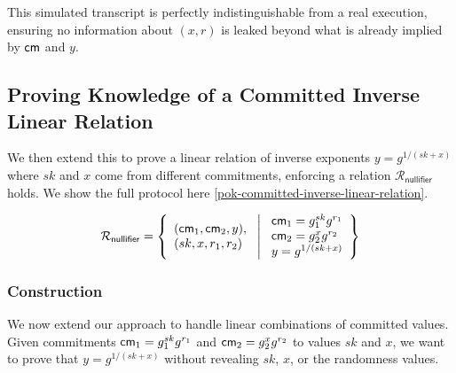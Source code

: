 This simulated transcript is perfectly indistinguishable from a real execution, ensuring no information about $(x, r)$ is leaked beyond what is already implied by $\mathsf{cm}$ and $y$.






























\subsection{Proving Knowledge of a Committed Inverse Linear Relation}

We then extend this to prove a linear relation of inverse exponents $y = g^{1/(sk+x)}$ where $sk$ and $x$ come from different commitments, enforcing a relation $\mathcal{R}_{\mathsf{nullifier}}$ holds. We show the full protocol here \ref{pok-committed-inverse-linear-relation}. 

\[
\mathcal{R}_{\mathsf{nullifier}} = \left\{ 
\begin{array}{l} (\mathsf{cm}_1, \mathsf{cm}_2, y),\\
(sk, x, r_1, r_2) 
\end{array}
\ \middle|
\ \begin{array}{l}
\mathsf{cm}_1 = g_1^{sk} g^{r_1} \\
\mathsf{cm}_2 = g_2^{x} g^{r_2} \\
y = g^{1/(sk + x)} \\
\end{array} \right\}
\]






\subsubsection{Construction}

We now extend our approach to handle linear combinations of committed values. Given commitments $\mathsf{cm}_1 = g_1^{sk} g^{r_1}$ and $\mathsf{cm}_2 = g_2^{x} g^{r_2}$ to values $sk$ and $x$, we want to prove that $y = g^{1/(sk + x)}$ without revealing $sk$, $x$, or the randomness values.


